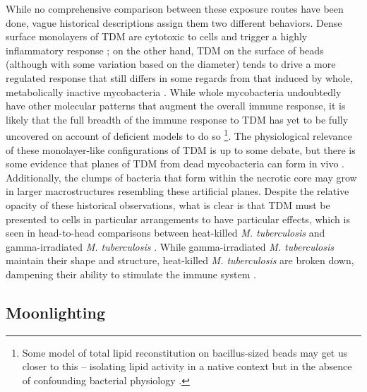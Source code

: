 While no comprehensive comparison between these exposure routes have been done, vague historical descriptions assign them two different behaviors. Dense surface monolayers of TDM are cytotoxic to cells and trigger a highly inflammatory response \citep{Retzinger1982, Schabbing1994, Hunter2006a, Welsh2013}; on the other hand, TDM on the surface of beads (although with some variation based on the diameter) tends to drive a more regulated response that still differs in some regards from that induced by whole, metabolically inactive mycobacteria \citep{Bowdish2009, Welsh2013}. While whole mycobacteria undoubtedly have other molecular patterns that augment the overall immune response, it is likely that the full breadth of the immune response to TDM has yet to be fully uncovered on account of deficient models to do so \footnote{Some model of total lipid reconstitution on bacillus\hyp{}sized beads may get us closer to this -- isolating lipid activity in a native context but in the absence of confounding bacterial physiology \citep{Rhoades2003}.}. The physiological relevance of these monolayer\hyp{}like configurations of TDM is up to some debate, but there is some evidence that planes of TDM from dead mycobacteria can form in vivo \citep{Hunter2006b, Glickman2008, Schabbing1994}. Additionally, the clumps of bacteria that form within the necrotic core may grow in larger macrostructures resembling these artificial planes. Despite the relative opacity of these historical observations, what is clear is that TDM must be presented to cells in particular arrangements to have particular effects, which is seen in head\hyp{}to\hyp{}head comparisons between heat\hyp{}killed \textit{M. tuberculosis} and gamma\hyp{}irradiated \textit{M. tuberculosis} \citep{Mosavari2021, Cha2015, Yang2018, Gleeson2016, Datta2006}. While gamma\hyp{}irradiated \textit{M. tuberculosis} maintain their shape and structure, heat\hyp{}killed \textit{M. tuberculosis} are broken down, dampening their ability to stimulate the immune system \citep{SecanellaFandos2014, Carpenter1959}. 

\subsection{Moonlighting}\label{moon}

